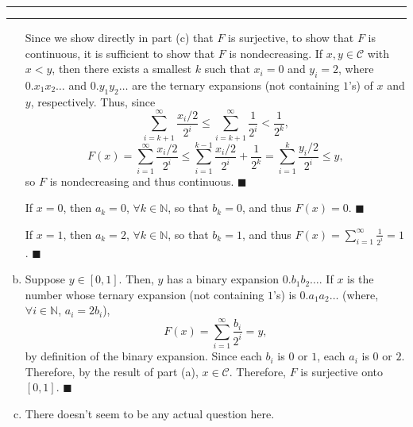 \documentclass[11pt]{article}
\newcounter{questionCounter}
\newcounter{partCounter}[questionCounter]
\newenvironment{question}[2][\arabic{questionCounter}]{%
    \setcounter{partCounter}{0}%
    \vspace{.25in} \hrule \vspace{0.5em}%
        \noindent{\bf #2}%
    \vspace{0.8em} \hrule \vspace{.10in}%
    \addtocounter{questionCounter}{1}%
}{}
\renewcommand{\qed}{\quad $\blacksquare$}
\newcommand{\N}{\mathbb{N}} %
\newcommand{\C}{\mathcal{C}} %
\begin{document}
\begin{question}{Chapter 1, Problem 2}
\begin{enumerate}[(a)]
Since we show directly in part (c) that $F$ is surjective, to show that $F$ is
continuous, it is sufficient to show that $F$ is nondecreasing.
If $x,y \in \C$ with $x < y$, then there exists a smallest $k$ such that
$x_i = 0$ and $y_i = 2$, where $0.x_1x_2\ldots$ and $0.y_1y_2\ldots$ are the
ternary expansions (not containing $1$'s) of $x$ and $y$, respectively. Thus,
since
\[\sum_{i = k + 1}^{\infty} \frac{x_i/2}{2^i}
 \leq \sum_{i = k + 1}^{\infty} \frac{1}{2^i}
 < \frac{1}{2^k},
\]
\[F(x)
 =    \sum_{i = 1}^{\infty} \frac{x_i/2}{2^i}
 \leq \sum_{i = 1}^{k - 1}  \frac{x_i/2}{2^i} + \frac{1}{2^k}
 =    \sum_{i = 1}^{k}      \frac{y_i/2}{2^i}
 \leq y,
\]
so $F$ is nondecreasing and thus continuous. \qed

If $x = 0$, then $a_k = 0$, $\forall k \in \N$, so that $b_k = 0$, and
thus $F(x) = 0$. \qed

If $x = 1$, then $a_k = 2$, $\forall k \in \N$, so that $b_k = 1$, and thus
$\displaystyle F(x) = \sum_{i = 1}^{\infty} \frac{1}{2^i} = 1$. \qed

\item Suppose $y \in [0,1]$. Then, $y$ has a binary expansion
$0.b_1b_2\ldots$. If $x$ is the number whose ternary expansion (not containing
$1$'s) is $0.a_1a_2\ldots$ (where, $\forall i \in \N$, $a_i = 2b_i$),
\[F(x) = \sum_{i = 1}^{\infty} \frac{b_i}{2^i} = y,\]
by definition of the binary expansion. Since each $b_i$ is $0$ or $1$, each
$a_i$ is $0$ or $2$. Therefore, by the result of part (a), $x \in \C$.
Therefore, $F$ is surjective onto $[0,1]$. \qed

\item There doesn't seem to be any actual question here.
\end{enumerate}
\end{question}
\end{document}
